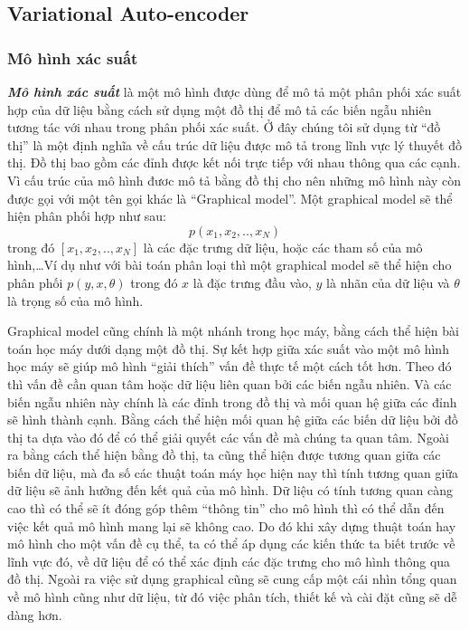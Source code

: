         \subsection{Variational Auto-encoder} 
        \subsubsection{Mô hình xác suất}
        \textbf{\textit{Mô hình xác suất}} là một mô hình được dùng để mô tả một phân 
        phối xác suất hợp của dữ liệu bằng cách sử dụng một đồ thị để mô tả các biến 
        ngẫu nhiên tương tác với nhau trong phân phối xác suất. Ở đây 
        chúng tôi sử dụng từ ``đồ thị'' là một định nghĩa về cấu trúc 
        dữ liệu được mô tả trong lĩnh vực lý thuyết đồ thị. Đồ thị 
        bao gồm các đỉnh được kết nối trực tiếp với nhau thông qua 
        các cạnh. Vì cấu trúc của mô hình đươc mô tả bằng đồ thị cho 
        nên những mô hình này còn được gọi với một tên gọi khác là 
        ``Graphical model''.
        Một graphical model sẽ thể hiện phân phối hợp như sau:
        $$p(x_1,x_2, .. ,x_N)$$
        trong đó $[x_1,x_2,..,x_N]$ là các đặc trưng dữ liệu, hoặc các tham số của mô hình,\dots Ví dụ như với bài toán phân loại thì một graphical model sẽ thể hiện cho phân phối $p(y,x, \theta)$ trong đó $x$ là đặc trưng đầu vào, $y$ là nhãn của dữ liệu và $\theta$ là trọng số của mô hình. 

        Graphical model cũng chính là một nhánh trong học máy, bằng cách thể hiện bài toán học máy dưới dạng một đồ thị. 
        Sự kết hợp giữa xác suất vào một mô hình học máy sẽ giúp mô hình ``giải thích'' vấn đề thực tế một cách tốt hơn. 
        Theo đó thì vấn đề cần quan tâm hoặc dữ liệu liên quan bởi các biến ngẫu nhiên. Và các biến ngẫu nhiên này chính là các đỉnh trong đồ thị và mối quan hệ giữa các đỉnh sẽ hình thành cạnh. Bằng cách thể hiện mối quan hệ giữa các biến dữ liệu bởi đồ thị ta dựa vào đó để có thể giải quyết các vấn đề mà chúng ta quan tâm. Ngoài ra bằng cách thể hiện bằng đồ thị, ta cũng thể hiện được tương quan giữa các biến dữ liệu, mà đa số các thuật toán máy học hiện nay thì tính tương quan giữa dữ liệu sẽ ảnh hưởng đến kết quả của mô hình. Dữ liệu có tính tương quan càng cao thì có thể sẽ ít đóng góp thêm ``thông tin'' cho mô hình thì có thể dẫn đến việc kết quả mô hình mang lại sẽ không cao. Do đó khi xây dựng thuật toán hay mô hình cho một vấn đề cụ thể, ta có thể áp dụng các kiến thức ta biết trước về lĩnh vực đó, về dữ liệu để có thể xác định các đặc trưng cho mô hình thông qua đồ thị. Ngoài ra việc sử dụng graphical cũng sẽ cung cấp một cái nhìn tổng quan về mô hình cũng như dữ liệu, từ đó việc phân tích, thiết kế và cài đặt cũng sẽ dễ dàng hơn.

